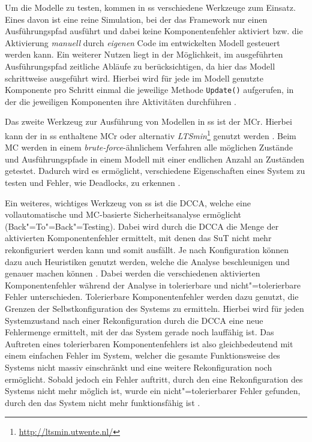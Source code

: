 Um die Modelle zu testen, kommen in \gls{ss} verschiedene Werkzeuge zum Einsatz.
Eines davon ist eine reine Simulation, bei der das Framework nur einen Ausführungspfad ausführt und dabei keine Komponentenfehler aktiviert bzw. die Aktivierung \textit{manuell} durch \textit{eigenen} Code im entwickelten Modell gesteuert werden kann.
Ein weiterer Nutzen liegt in der Möglichkeit, im ausgeführten Ausführungspfad zeitliche Abläufe zu berücksichtigen, da hier das Modell schrittweise ausgeführt wird.
Hierbei wird für jede im Modell genutzte Komponente pro Schritt einmal die jeweilige Methode \texttt{Update()} aufgerufen, in der die jeweiligen Komponenten ihre Aktivitäten durchführen \cite{Habermaier2016}.

Das zweite Werkzeug zur Ausführung von Modellen in \gls{ss} ist der \gls{MCr}.
Hierbei kann der in \gls{ss} enthaltene \gls{MCr} oder alternativ \emph{LTSmin}\footnote{\url{http://ltsmin.utwente.nl/}} genutzt werden \cite{SSWikiModelChecking,Habermaier2016}.
Beim \gls{MC} werden in einem \textit{brute-force}-ähnlichem Verfahren alle möglichen Zustände und Ausführungspfade in einem Modell mit einer endlichen Anzahl an Zuständen getestet.
Dadurch wird es ermöglicht, verschiedene Eigenschaften eines System zu testen und Fehler, wie \zB Deadlocks, zu erkennen \cite{Baier2008}.

Ein weiteres, wichtiges Werkzeug von \gls{ss} ist die \gls{DCCA}, welche eine vollautomatische und \gls{MC}-basierte Sicherheitsanalyse ermöglicht (Back"=To"=Back"=Testing).
Dabei wird durch die \gls{DCCA} die Menge der aktivierten Komponentenfehler ermittelt, mit denen das \gls{SuT} nicht mehr rekonfiguriert werden kann und somit ausfällt.
Je nach Konfiguration können dazu auch Heuristiken genutzt werden, welche die Analyse beschleunigen und genauer machen können \cite{Eberhardinger2016}.
Dabei werden die verschiedenen aktivierten Komponentenfehler während der Analyse in tolerierbare und nicht"=tolerierbare Fehler unterschieden.
Tolerierbare Komponentenfehler werden dazu genutzt, die Grenzen der Selbstkonfiguration des Systems zu ermitteln.
Hierbei wird für jeden Systemzustand nach einer Rekonfiguration durch die \gls{DCCA} eine neue Fehlermenge ermittelt, mit der das System gerade noch lauffähig ist.
Das Auftreten eines tolerierbaren Komponentenfehlers ist also gleichbedeutend mit einem einfachen Fehler im System, welcher die gesamte Funktionsweise des Systems nicht massiv einschränkt und eine weitere Rekonfiguration noch ermöglicht.
Sobald jedoch ein Fehler auftritt, durch den eine Rekonfiguration des Systems nicht mehr möglich ist, wurde ein nicht"=tolerierbarer Fehler gefunden, durch den das System nicht mehr funktionsfähig ist \cite{Habermaier2015}.
